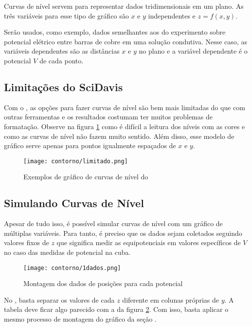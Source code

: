 Curvas de nível servem para representar dados tridimensionais em um plano. As três variáveis para esse tipo de gráfico são $x$ e $y$ independentes e $z = f(x,y)$.

Serão usados, como exemplo, dados semelhantes aos do experimento sobre potencial elétrico entre barras de cobre em uma solução condutiva. Nesse caso, as variáveis dependentes são as distâncias $x$ e $y$ no plano e a variável dependente é o potencial $V$ de cada ponto.


\subsection{Limitações do SciDavis}

    Com o \software, as opções para fazer curvas de nível são bem mais limitadas do que com outras ferramentas e os resultados costumam ter muitos problemas de formatação. Observe na figura \ref{fig:contorno:limitado} como é difícil a leitura dos níveis com as cores e como as curvas de nível não fazem muito sentido. Além disso, esse modelo de gráfico serve apenas para pontos igualmente espaçados de $x$ e $y$.

    \begin{figure}[htbp]
        \centering
        \texttt{[image: contorno/limitado.png]}

        \caption{Exemplos de gráfico de curvas de nível do \software}
        \label{fig:contorno:limitado}
    \end{figure}


\subsection{Simulando Curvas de Nível}

    Apesar de tudo isso, é possível simular curvas de nível com um gráfico de múltiplas variáveis. Para tanto, é preciso que os dados sejam coletados seguindo valores fixos de $z$ que significa medir as equipotenciais em valores específicos de $V$ no caso das medidas de potencial na cuba.

    \begin{figure}[htbp]
        \centering
        \texttt{[image: contorno/1dados.png]}

        \caption{Montagem dos dados de posições para cada potencial}
        \label{fig:contorno:dados}
    \end{figure}

    No \software, basta separar os valores de cada $z$ diferente em colunas próprias de $y$. A tabela deve ficar algo parecido com a da figura \ref{fig:contorno:dados}. Com isso, basta aplicar o mesmo processo de montagem do gráfico da seção .


